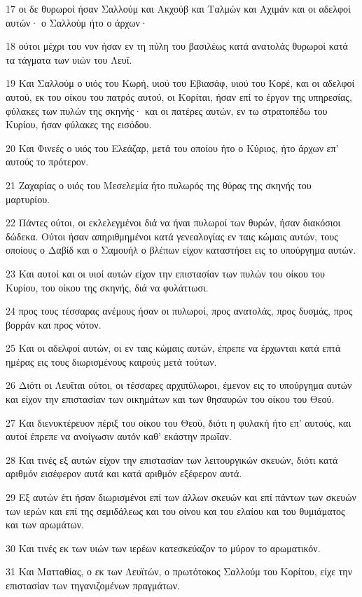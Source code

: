\par 17 οι δε θυρωροί ήσαν Σαλλούμ και Ακχούβ και Ταλμών και Αχιμάν και οι αδελφοί αυτών· ο Σαλλούμ ήτο ο άρχων·
\par 18 ούτοι μέχρι του νυν ήσαν εν τη πύλη του βασιλέως κατά ανατολάς θυρωροί κατά τα τάγματα των υιών του Λευΐ.
\par 19 Και Σαλλούμ ο υιός του Κωρή, υιού του Εβιασάφ, υιού του Κορέ, και οι αδελφοί αυτού, εκ του οίκου του πατρός αυτού, οι Κορίται, ήσαν επί το έργον της υπηρεσίας, φύλακες των πυλών της σκηνής· και οι πατέρες αυτών, εν τω στρατοπέδω του Κυρίου, ήσαν φύλακες της εισόδου.
\par 20 Και Φινεές ο υιός του Ελεάζαρ, μετά του οποίου ήτο ο Κύριος, ήτο άρχων επ' αυτούς το πρότερον.
\par 21 Ζαχαρίας ο υιός του Μεσελεμία ήτο πυλωρός της θύρας της σκηνής του μαρτυρίου.
\par 22 Πάντες ούτοι, οι εκλελεγμένοι διά να ήναι πυλωροί των θυρών, ήσαν διακόσιοι δώδεκα. Ούτοι ήσαν απηριθμημένοι κατά γενεαλογίας εν ταις κώμαις αυτών, τους οποίους ο Δαβίδ και ο Σαμουήλ ο βλέπων είχον καταστήσει εις το υπούργημα αυτών.
\par 23 Και αυτοί και οι υιοί αυτών είχον την επιστασίαν των πυλών του οίκου του Κυρίου, του οίκου της σκηνής, διά να φυλάττωσι.
\par 24 προς τους τέσσαρας ανέμους ήσαν οι πυλωροί, προς ανατολάς, προς δυσμάς, προς βορράν και προς νότον.
\par 25 Και οι αδελφοί αυτών, οι εν ταις κώμαις αυτών, έπρεπε να έρχωνται κατά επτά ημέρας εις τους διωρισμένους καιρούς μετά τούτων.
\par 26 Διότι οι Λευΐται ούτοι, οι τέσσαρες αρχιπύλωροι, έμενον εις το υπούργημα αυτών και είχον την επιστασίαν των οικημάτων και των θησαυρών του οίκου του Θεού.
\par 27 Και διενυκτέρευον πέριξ του οίκου του Θεού, διότι η φυλακή ήτο επ' αυτούς, και αυτοί έπρεπε να ανοίγωσιν αυτόν καθ' εκάστην πρωΐαν.
\par 28 Και τινές εξ αυτών είχον την επιστασίαν των λειτουργικών σκευών, διότι κατά αριθμόν εισέφερον αυτά και κατά αριθμόν εξέφερον αυτά.
\par 29 Εξ αυτών έτι ήσαν διωρισμένοι επί των άλλων σκευών και επί πάντων των σκευών των ιερών και επί της σεμιδάλεως και του οίνου και του ελαίου και του θυμιάματος και των αρωμάτων.
\par 30 Και τινές εκ των υιών των ιερέων κατεσκεύαζον το μύρον το αρωματικόν.
\par 31 Και Ματταθίας, ο εκ των Λευϊτών, ο πρωτότοκος Σαλλούμ του Κορίτου, είχε την επιστασίαν των τηγανιζομένων πραγμάτων.
